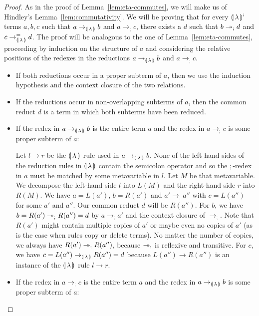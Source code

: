 \begin{proof}
  As in the proof of Lemma~\ref{lem:eta-commutes}, we will make us of
  Hindley's Lemma~\ref{lem:commutativity}. We will be proving that for
  every ${\llparenthesis \, \lambda \, \rrparenthesis}^;$ terms $a,b,c$ such that $a \to_{\llparenthesis \, \lambda \, \rrparenthesis} b$ and $a \to_; c$,
  there exists a $d$ such that $b \twoheadrightarrow_; d$ and $c \to_{\llparenthesis \, \lambda \, \rrparenthesis}^= d$. The
  proof will be analogous to the one of Lemma~\ref{lem:eta-commutes},
  proceeding by induction on the structure of $a$ and considering the
  relative positions of the redexes in the reductions $a \to_{\llparenthesis \, \lambda \, \rrparenthesis} b$ and
  $a \to_; c$.

  \begin{itemize}
  \item If both reductions occur in a proper subterm of $a$, then we use
    the induction hypothesis and the context closure of the two relations.

  \item If the reductions occur in non-overlapping subterms of $a$, then
    the common reduct $d$ is a term in which both subterms have been
    reduced.

  \item If the redex in $a \to_{\llparenthesis \, \lambda \, \rrparenthesis} b$ is the entire term $a$ and the
    redex in $a \to_; c$ is some proper subterm of $a$:

    Let $l \to r$ be the ${\llparenthesis \, \lambda \, \rrparenthesis}$ rule used in $a \to_{\llparenthesis \, \lambda \, \rrparenthesis} b$. None of the
    left-hand sides of the reduction rules in ${\llparenthesis \, \lambda \, \rrparenthesis}$ contain the semicolon
    operator and so the $;$-redex in $a$ must be matched by some
    metavariable in $l$. Let $M$ be that metavariable. We decompose the
    left-hand side $l$ into $L(M)$ and the right-hand side $r$ into
    $R(M)$. We have $a = L(a')$, $b = R(a')$ and $a' \to_; a''$ with
    $c = L(a'')$ for some $a'$ and $a''$. Our common reduct $d$ will be
    $R(a'')$. For $b$, we have $b = R(a') \twoheadrightarrow_; R(a'') = d$ by
    $a \to_; a'$ and the context closure of $\to_;$. Note that $R(a')$
    might contain multiple copies of $a'$ or maybe even no copies of $a'$
    (as is the case when rules copy or delete terms). No matter the number
    of copies, we always have $R(a') \twoheadrightarrow_; R(a'')$, because $\twoheadrightarrow_;$ is
    reflexive and transitive. For $c$, we have
    $c = L(a'') \to_{\llparenthesis \, \lambda \, \rrparenthesis} R(a'') = d$ because $L(a'') \to R(a'')$ is an
    instance of the ${\llparenthesis \, \lambda \, \rrparenthesis}$ rule $l \to r$.

  \item If the redex in $a \to_; c$ is the entire term $a$ and the redex in
    $a \to_{\llparenthesis \, \lambda \, \rrparenthesis} b$ is some proper subterm of $a$:


\end{itemize}
\end{proof}
